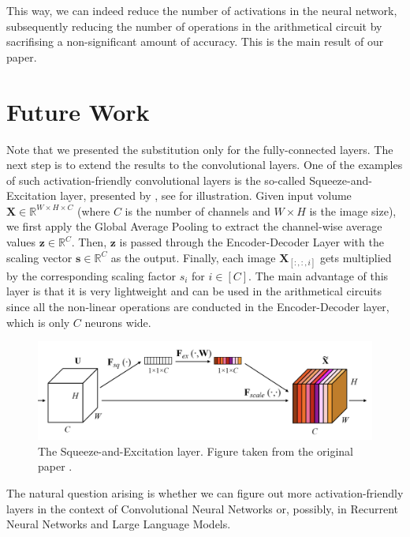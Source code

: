 \documentclass[12pt,a4paper,oneside]{book}
\theoremstyle{dplplain}
\theoremstyle{dpldefinition}
\theoremstyle{dplremark}
\begin{document}
This way, we can indeed reduce the number of activations in the neural network, 
subsequently reducing the number of operations in the arithmetical circuit by 
sacrifising a non-significant amount of accuracy. This is the main result of our paper.

\section{Future Work}

Note that we presented the substitution only for the fully-connected layers. The
next step is to extend the results to the convolutional layers. One of the
examples of such activation-friendly convolutional layers is the so-called
Squeeze-and-Excitation layer, presented by \cite{se-network}, see
 for illustration. Given input volume $\mathbf{X} \in
\mathbb{R}^{W \times H \times C}$ (where $C$ is the number of channels and $W
\times H$ is the image size), we first apply the Global Average Pooling to
extract the channel-wise average values $\mathbf{z} \in \mathbb{R}^C$. Then,
$\mathbf{z}$ is passed through the Encoder-Decoder Layer with the scaling vector
$\mathbf{s} \in \mathbb{R}^C$ as the output. Finally, each image
$\mathbf{X}_{[:,:,i]}$ gets multiplied by the corresponding scaling factor $s_i$
for $i \in [C]$. The main advantage of this layer is that it is very lightweight
and can be used in the arithmetical circuits since all the non-linear operations
are conducted in the Encoder-Decoder layer, which is only $C$ neurons wide.

\begin{figure}
    \centering
    \includegraphics[width=\textwidth]{figures/se.png}
    \caption{The Squeeze-and-Excitation layer. Figure taken from 
    the original paper \cite{se-network}.}
    \label{figure:se}
\end{figure}

The natural question arising is whether we can figure out more
activation-friendly layers in the context of Convolutional Neural Networks or,
possibly, in Recurrent Neural Networks and Large Language Models.
\end{document}
